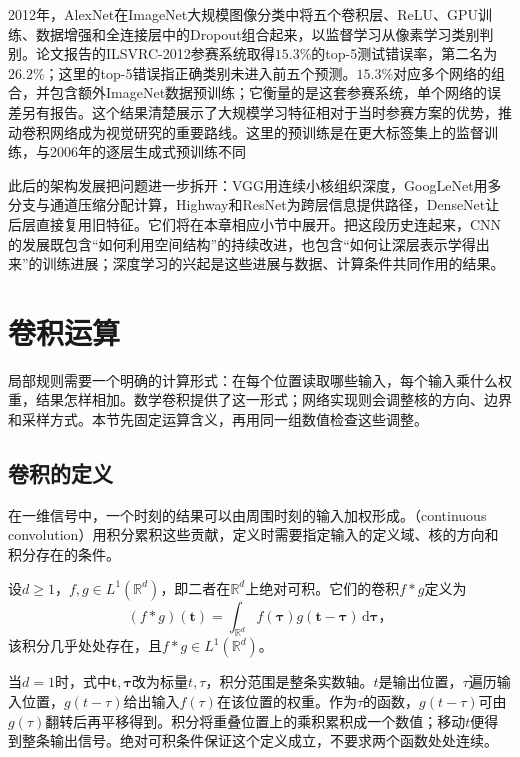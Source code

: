 2012年，AlexNet在ImageNet大规模图像分类中将五个卷积层、ReLU、GPU训练、数据增强和全连接层中的Dropout组合起来，以监督学习从像素学习类别判别。论文报告的ILSVRC-2012参赛系统取得$15.3\%$的top-5测试错误率，第二名为$26.2\%$；这里的top-5错误指正确类别未进入前五个预测。$15.3\%$对应多个网络的组合，并包含额外ImageNet数据预训练；它衡量的是这套参赛系统，单个网络的误差另有报告。这个结果清楚展示了大规模学习特征相对于当时参赛方案的优势，推动卷积网络成为视觉研究的重要路线。这里的预训练是在更大标签集上的监督训练，与2006年的逐层生成式预训练不同

此后的架构发展把问题进一步拆开：VGG用连续小核组织深度，GoogLeNet用多分支与通道压缩分配计算，Highway和ResNet为跨层信息提供路径，DenseNet让后层直接复用旧特征。它们将在本章相应小节中展开。把这段历史连起来，CNN的发展既包含“如何利用空间结构”的持续改进，也包含“如何让深层表示学得出来”的训练进展；深度学习的兴起是这些进展与数据、计算条件共同作用的结果。

\section{卷积运算}
\label{sec:cnn-convolution}

局部规则需要一个明确的计算形式：在每个位置读取哪些输入，每个输入乘什么权重，结果怎样相加。数学卷积提供了这一形式；网络实现则会调整核的方向、边界和采样方式。本节先固定运算含义，再用同一组数值检查这些调整。

\subsection{卷积的定义}
\label{sec:cnn-convolution-definition}

在一维信号中，一个时刻的结果可以由周围时刻的输入加权形成。（continuous convolution）用积分累积这些贡献，定义时需要指定输入的定义域、核的方向和积分存在的条件。

\begin{definition}[连续卷积]
  \label{def:cnn-continuous-convolution}
  设$d\geq1$，$f,g\in L^1(\mathbb R^d)$，即二者在$\mathbb R^d$上绝对可积。它们的卷积$f*g$定义为
  \begin{equation}
    (f*g)(\bm t)=\int_{\mathbb R^d}
      f(\bm\tau)g(\bm t-\bm\tau)\,\mathrm d\bm\tau\text{，}
    \label{eq:cnn-continuous-convolution}
  \end{equation}
  该积分几乎处处存在，且$f*g\in L^1(\mathbb R^d)$。
\end{definition}

当$d=1$时，式中$\bm t,\bm\tau$改为标量$t,\tau$，积分范围是整条实数轴。$t$是输出位置，$\tau$遍历输入位置，$g(t-\tau)$给出输入$f(\tau)$在该位置的权重。作为$\tau$的函数，$g(t-\tau)$可由$g(\tau)$翻转后再平移得到。积分将重叠位置上的乘积累积成一个数值；移动$t$便得到整条输出信号。绝对可积条件保证这个定义成立，不要求两个函数处处连续。

